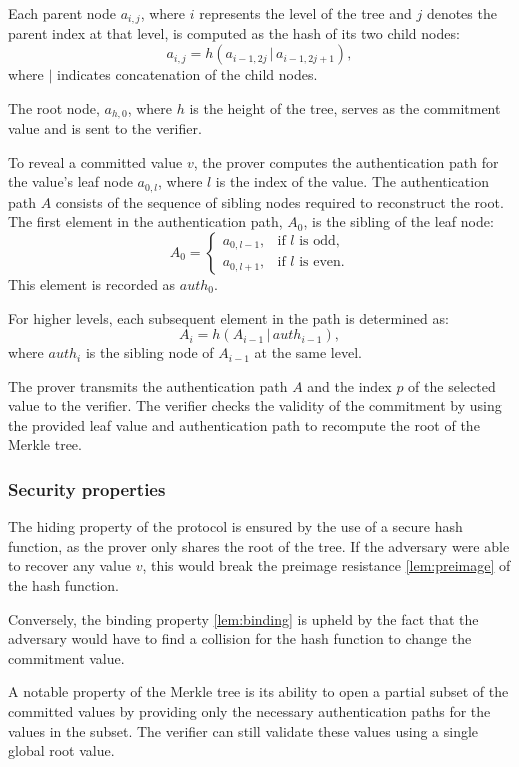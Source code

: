 \documentclass[twoside,11pt]{report}
\theoremstyle{definition}
\theoremstyle{plain}
\begin{document}
Each parent node $a_{i,j}$, where $i$ represents the level of the tree and $j$ denotes the parent index at that level, is computed as the hash of its two child nodes:
\[
  a_{i,j} = h(a_{i-1,2j} \, | \, a_{i-1,2j+1}),
\]
where $|$ indicates concatenation of the child nodes.

The root node, $a_{h,0}$, where $h$ is the height of the tree, serves as the commitment value and is sent to the verifier.

To reveal a committed value $v$, the prover computes the authentication path for the value's leaf node $a_{0,l}$, where $l$ is the index of the value. The authentication path $A$ consists of the sequence of sibling nodes required to reconstruct the root. The first element in the authentication path, $A_0$, is the sibling of the leaf node:
\[
  A_0 =
  \begin{cases}
    a_{0,l-1}, & \text{if } l \text{ is odd,}  \\
    a_{0,l+1}, & \text{if } l \text{ is even.}
  \end{cases}
\]
This element is recorded as $auth_0$.

For higher levels, each subsequent element in the path is determined as:
\[
  A_i = h(A_{i-1} \, | \, auth_{i-1}),
\]
where $auth_i$ is the sibling node of $A_{i-1}$ at the same level.

The prover transmits the authentication path $A$ and the index $p$ of the selected value to the verifier. The verifier checks the validity of the commitment by using the provided leaf value and authentication path to recompute the root of the Merkle tree.

\subsubsection{Security properties}

The hiding property of the protocol is ensured by the use of a secure hash function, as the prover only shares the root of the tree. If the adversary were able to recover any value $v$, this would break the preimage resistance \autoref{lem:preimage} of the hash function.

Conversely, the binding property \autoref{lem:binding} is upheld by the fact that the adversary would have to find a collision for the hash function to change the commitment value.

A notable property of the Merkle tree is its ability to open a partial subset of the committed values by providing only the necessary authentication paths for the values in the subset. The verifier can still validate these values using a single global root value.
\end{document}
